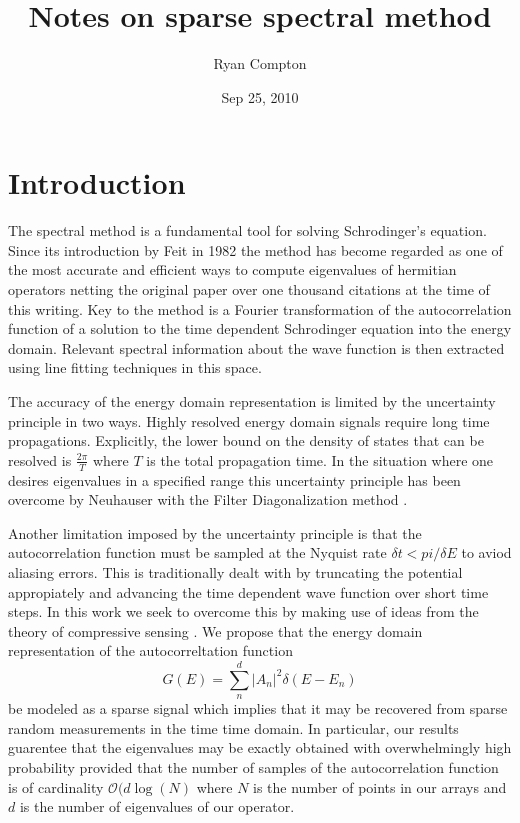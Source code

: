 \documentclass[12pt]{amsart}
\title{Notes on sparse spectral method}
\author{Ryan Compton}
\date{Sep 25, 2010}
\theoremstyle{remark}
\begin{document}
\maketitle

\section{Introduction}

The spectral method is a fundamental tool for solving Schrodinger's equation. Since its introduction by Feit in 1982 \cite{FEIT1982} the method has become regarded as one of the most accurate and efficient ways to compute eigenvalues of hermitian operators netting the original paper over one thousand citations at the time of this writing. Key to the method is a Fourier transformation of the autocorrelation function of a solution to the time dependent Schrodinger equation into the energy domain. Relevant spectral information about the wave function is then extracted using line fitting techniques in this space.

The accuracy of the energy domain representation is limited by the uncertainty principle in two ways. Highly resolved energy domain signals require long time propagations. Explicitly, the lower bound on the density of states that can be resolved is $\frac{2 \pi}{T}$ where $T$ is the total propagation time. In the situation where one desires eigenvalues in a specified range this uncertainty principle has been overcome by Neuhauser with the Filter Diagonalization method \cite{Wall1995} \cite{Neuhauser1994} \cite{Mandelshtam2001}.

Another limitation imposed by the uncertainty principle is that the autocorrelation function must be sampled at the Nyquist rate $ \delta t < pi / \delta E $ to aviod aliasing errors. This is traditionally dealt with by truncating the potential appropiately and advancing the time dependent wave function over short time steps. In this work we seek to overcome this by making use of ideas from the theory of compressive sensing \cite{Candes2006}. We propose that the energy domain representation of the autocorreltation function
\begin{equation}
G(E) = \sum_n^d |A_n|^2 \delta(E-E_n)
\end{equation}
be modeled as a sparse signal which implies that it may be recovered from sparse random measurements in the time time domain. In particular, our results guarentee that the eigenvalues may be exactly obtained with overwhelmingly high probability provided that the number of samples of the autocorrelation function is of cardinality $\mathcal{O}(d \log(N)$ where $N$ is the number of points in our arrays and $d$ is the number of eigenvalues of our operator.
\end{document}
